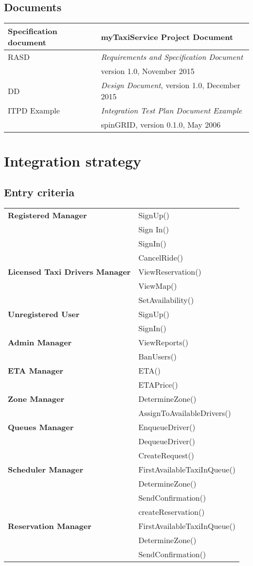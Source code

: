 \documentclass[12pt, oneside]{book}   	%
\begin{document}
\section{Documents}
\begin{tabular}{|l|l|}
\hline
Specification document & myTaxiService Project Document\\
\hline
RASD & \textit{Requirements and Specification Document} \\
& version 1.0, November 2015 \\
\hline
DD & \textit{Design Document}, version 1.0, December 2015 \\
\hline
ITPD Example & \textit{Integration Test Plan Document Example} \\
& spinGRID, version 0.1.0, May 2006\\
\hline
\end{tabular}
\chapter{Integration strategy}
\section{Entry criteria}
\begin{tabular}{|l|l|}
\hline
\textbf{Registered Manager} \hspace{4cm} &SignUp()  \hspace{4cm} \\
& Sign In()\\
\hline
& SignIn()\\
& CancelRide()\\
\textbf{Licensed Taxi Drivers Manager}  & ViewReservation()\\
& ViewMap()\\
& SetAvailability()\\
\hline
\textbf{Unregistered User} & SignUp()\\
\hline 
& SignIn()\\
\textbf{Admin Manager} & ViewReports()\\
& BanUsers()\\
\hline
\textbf{ETA Manager} & ETA()\\
& ETAPrice()\\
\hline
\textbf{Zone Manager} & DetermineZone()\\
& AssignToAvailableDrivers()\\
\hline
\textbf{Queues Manager} & EnqueueDriver()\\
& DequeueDriver()\\
\hline
& CreateRequest()\\
\textbf{Scheduler Manager}  & FirstAvailableTaxiInQueue()\\
& DetermineZone()\\
& SendConfirmation()\\
\hline
& createReservation()\\
\textbf{Reservation Manager}  & FirstAvailableTaxiInQueue()\\
& DetermineZone()\\
& SendConfirmation()\\
\hline
\end{tabular}
\end{document}
